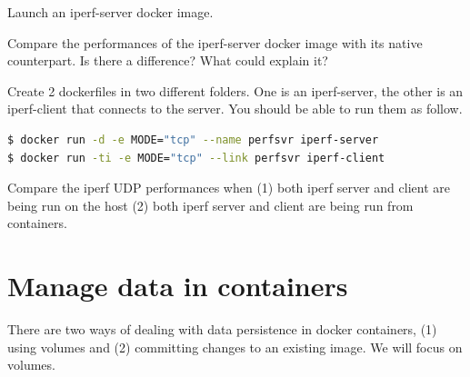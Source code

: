 \documentclass[a4paper,11pt]{exam}
\begin{document}
\begin{questions}
\question Launch an iperf-server docker image.

\question Compare the performances of the iperf-server docker image with its native counterpart. Is there a difference? What could explain it?

\question Create 2 dockerfiles in two different folders. One is an iperf-server, the other is an iperf-client that connects to the server. You should be able to run them as follow.
\begin{lstlisting}[frame=single,language={sh}]
$ docker run -d -e MODE="tcp" --name perfsvr iperf-server
$ docker run -ti -e MODE="tcp" --link perfsvr iperf-client
\end{lstlisting}

\question Compare the iperf UDP performances when (1) both iperf server and client are being run on the host (2) both iperf server and client are being run from containers.
\end{questions}


\section{Manage data in containers}

There are two ways of dealing with data persistence in docker containers, (1) using volumes and (2) committing changes to an existing image. We will focus on volumes.
\end{document}
